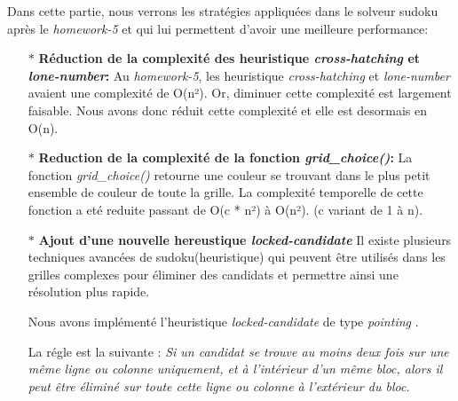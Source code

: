 \documentclass{article}
\begin{document}
Dans cette partie, nous verrons les stratégies appliquées dans le solveur sudoku après le \textit{homework-5} et qui lui permettent d'avoir une meilleure performance:
\vspace{0.2cm}
\begin{enumerate}
    \item[$\ast$] \textbf{Réduction de la complexité des heuristique \textit{cross-hatching} et \textit{lone-number}: } \vspace{0.12cm} \newline
    Au \textit{homework-5}, les heuristique  \textit{cross-hatching} et \textit{lone-number} avaient une complexité de O(n²). Or, diminuer cette complexité est largement faisable. Nous avons donc réduit cette complexité et elle est desormais en O(n).\vspace{0.2cm}
    \item[$\ast$] \textbf{Reduction de la complexité de la fonction  \textit{grid\_choice()}: } \vspace{0.12cm} \newline
    La fonction \textit{grid\_choice()} retourne une couleur se trouvant dans le plus petit ensemble de couleur de toute la grille. La complexité temporelle de cette fonction a eté reduite passant de O(c * n²) à O(n²). (c variant de 1 à n). \vspace{0.12cm}
    \item[$\ast$] \textbf{Ajout d'une nouvelle hereustique \textit{locked-candidate}} \vspace{0.12cm} \newline
    Il existe plusieurs techniques avancées de sudoku(heuristique)  qui peuvent être utilisés dans les grilles complexes pour éliminer des candidats et permettre ainsi une résolution plus rapide.\vspace{0.2cm}

    Nous avons implémenté l'heuristique \textit{locked-candidate} de type \textit{pointing} . 
    
    La régle est la suivante \cite{locked_candidates_rules}:
    \textit{Si un candidat se trouve au moins deux fois sur une même ligne ou colonne uniquement, et à l’intérieur d’un même bloc, alors il peut être éliminé sur toute cette ligne ou colonne à l’extérieur du bloc.}  
    

\end{enumerate}
\end{document}
